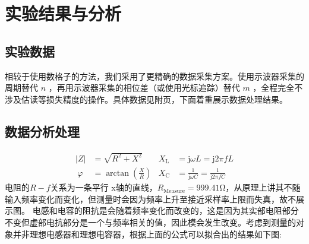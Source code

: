 \documentclass[a4paper,utf8]{article}
\begin{document}
\section{实验结果与分析}
    \subsection{实验数据}
        相较于使用数格子的方法，我们采用了更精确的数据采集方案。使用示波器采集的周期替代 $n$ ，再用示波器采集的相位差（或使用光标追踪）替代 $m$ ，全程完全不涉及估读等损失精度的操作。具体数据见附页，下面着重展示数据处理结果。
    \subsection{数据分析处理}
        \begin{align*}
            \left|Z\right|&=\sqrt{R^2+X^2} & X_\text{L} &= \mathrm{j} \omega L=\mathrm{j} 2\pi f L\\\
            \varphi&=\arctan\left(\frac X R\right) & X_\text{C} &= \frac{1}{\mathrm{j} \omega C}=\frac{1}{\mathrm{j} 2\pi f C}
        \end{align*}
        电阻的$R-f$关系为一条平行 x轴的直线，$R_\text{Measure}=999.41\unit{\ohm}$，从原理上讲其不随输入频率变化而变化，但测量时会因为频率上升至接近采样率上限而失真，故不展示图。\newpage
        电感和电容的阻抗是会随着频率变化而改变的，这是因为其实部电阻部分不变但虚部电抗部分是一个与频率相关的值，因此模会发生改变。考虑到测量的对象并非理想电感器和理想电容器，根据上面的公式可以拟合出的结果如下图:\par
\end{document}
